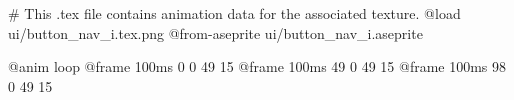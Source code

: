 # This .tex file contains animation data for the associated texture.
@load ui/button_nav_i.tex.png
@from-aseprite ui/button_nav_i.aseprite

@anim loop
	@frame 100ms 0 0 49 15
	@frame 100ms 49 0 49 15
	@frame 100ms 98 0 49 15
